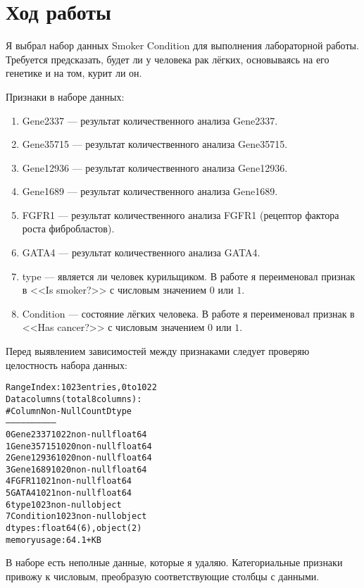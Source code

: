 \graphicspath{{images/}}

\section{Ход работы}

Я выбрал набор данных Smoker Condition \cite{kaggle} для выполнения лабораторной работы. Требуется предсказать, будет ли у человека рак лёгких, основываясь на его генетике и на том, курит ли он.

Признаки в наборе данных:

\begin{enumerate}
    \item
    Gene2337 --- результат количественного анализа Gene2337.
    \item
    Gene35715 --- результат количественного анализа Gene35715.
    \item
    Gene12936 --- результат количественного анализа Gene12936.
    \item
    Gene1689 --- результат количественного анализа Gene1689.
    \item
    FGFR1 --- результат количественного анализа FGFR1 (рецептор фактора роста фибробластов).
    \item
    GATA4 --- результат количественного анализа GATA4.
    \item
    type --- является ли человек курильщиком. В работе я переименовал признак в <<Is smoker?>> с числовым значением $0$ или $1$.
    \item
    Condition --- состояние лёгких человека. В работе я переименовал признак в <<Has cancer?>> с числовым значением $0$ или $1$.
\end{enumerate}

Перед выявлением зависимостей между признаками следует проверяю целостность набора данных:
\begin{alltt}
RangeIndex: 1023 entries, 0 to 1022
Data columns (total 8 columns):
 #   Column     Non-Null Count  Dtype
---  ------     --------------  -----
 0   Gene2337   1022 non-null   float64
 1   Gene35715  1020 non-null   float64
 2   Gene12936  1020 non-null   float64
 3   Gene1689   1020 non-null   float64
 4   FGFR1      1021 non-null   float64
 5   GATA4      1021 non-null   float64
 6   type       1023 non-null   object
 7   Condition  1023 non-null   object
dtypes: float64(6), object(2)
memory usage: 64.1+ KB
\end{alltt}

В наборе есть неполные данные, которые я удаляю. Категориальные признаки привожу к числовым, преобразую соответствующие столбцы с данными.

